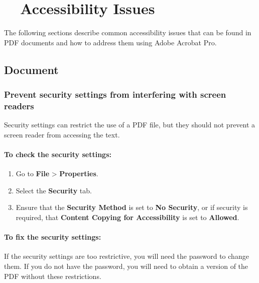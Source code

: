 \section{~~Accessibility Issues}
\label{sec:accessibility-issues}

The following sections describe common accessibility issues that can be found in PDF documents and how to address them using Adobe Acrobat Pro.

\subsection{Document}
\label{sub:document}

\subsubsection{Prevent security settings from interfering with screen readers}
\label{ssub:prevent-security-settings-from-interfering-with-screen-readers}

Security settings can restrict the use of a PDF file, but they should not prevent a screen reader from accessing the text.

\paragraph{To check the security settings:}
\label{par:to-check-the-security-settings}

\begin{enumerate}
	\itemsep-0.5em
	\item Go to \textbf{File} > \textbf{Properties}.
	\item Select the \textbf{Security} tab.
	\item Ensure that the \textbf{Security Method} is set to \textbf{No Security}, or if security is required, that \textbf{Content Copying for Accessibility} is set to \textbf{Allowed}.
\end{enumerate}

\paragraph{To fix the security settings:}
\label{par:to-fix-the-security-settings}

If the security settings are too restrictive, you will need the password to change them. If you do not have the password, you will need to obtain a version of the PDF without these restrictions.

